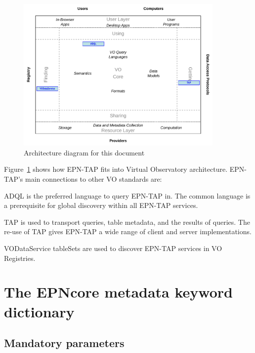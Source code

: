 \documentclass[11pt,a4paper]{ivoa}
\begin{document}
\begin{figure}[thb]
\centering

\includegraphics[width=0.9\textwidth]{role_diagram.pdf}
\caption{Architecture diagram for this document}
\label{fig:archdiag}
\end{figure}


Figure~\ref{fig:archdiag} shows how EPN-TAP fits into Virtual
Observatory architecture.  EPN-TAP's main connections to other VO
standards are:

\begin{bigdescription}
\item[\citet{2008ivoa.spec.1030O}] ADQL is the preferred language to
query EPN-TAP in.  The common language is a prerequisite for global
discovery within all EPN-TAP services.
\item[\citet{2010ivoa.spec.0327D}] TAP is used to transport queries,
table metadata, and the results of queries.  The re-use of TAP gives
EPN-TAP a wide range of client and server implementations.
\item[\citet{2010ivoa.spec.1202P}] VODataService tableSets are used to
discover EPN-TAP services in VO Registries.
\end{bigdescription}

\section{The EPNcore metadata keyword dictionary} 


\subsection{Mandatory parameters}
\end{document}
